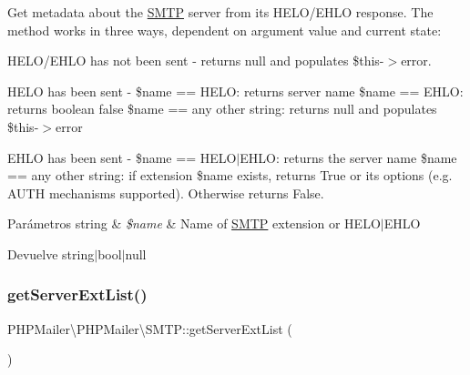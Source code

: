Get metadata about the \hyperlink{classPHPMailer_1_1PHPMailer_1_1SMTP}{S\+M\+TP} server from its H\+E\+L\+O/\+E\+H\+LO response. The method works in three ways, dependent on argument value and current state\+:
\begin{DoxyEnumerate}
\item H\+E\+L\+O/\+E\+H\+LO has not been sent -\/ returns null and populates \$this-\/$>$error.
\item H\+E\+LO has been sent -\/ \$name == \textquotesingle{}H\+E\+LO\textquotesingle{}\+: returns server name \$name == \textquotesingle{}E\+H\+LO\textquotesingle{}\+: returns boolean false \$name == any other string\+: returns null and populates \$this-\/$>$error
\item E\+H\+LO has been sent -\/ \$name == \textquotesingle{}H\+E\+LO\textquotesingle{}$\vert$\textquotesingle{}E\+H\+LO\textquotesingle{}\+: returns the server name \$name == any other string\+: if extension \$name exists, returns True or its options (e.\+g. A\+U\+TH mechanisms supported). Otherwise returns False.
\end{DoxyEnumerate}


\begin{DoxyParams}[1]{Parámetros}
string & {\em \$name} & Name of \hyperlink{classPHPMailer_1_1PHPMailer_1_1SMTP}{S\+M\+TP} extension or \textquotesingle{}H\+E\+LO\textquotesingle{}$\vert$\textquotesingle{}E\+H\+LO\textquotesingle{}\\
\hline
\end{DoxyParams}
\begin{DoxyReturn}{Devuelve}
string$\vert$bool$\vert$null 
\end{DoxyReturn}
\mbox{\label{classPHPMailer_1_1PHPMailer_1_1SMTP_a48bc761bfea302060c6d08933d83a6ef}} 
\subsubsection{\texorpdfstring{get\+Server\+Ext\+List()}{getServerExtList()}}
{\footnotesize\ttfamily P\+H\+P\+Mailer\textbackslash{}\+P\+H\+P\+Mailer\textbackslash{}\+S\+M\+T\+P\+::get\+Server\+Ext\+List (\begin{DoxyParamCaption}{ }\end{DoxyParamCaption})}

